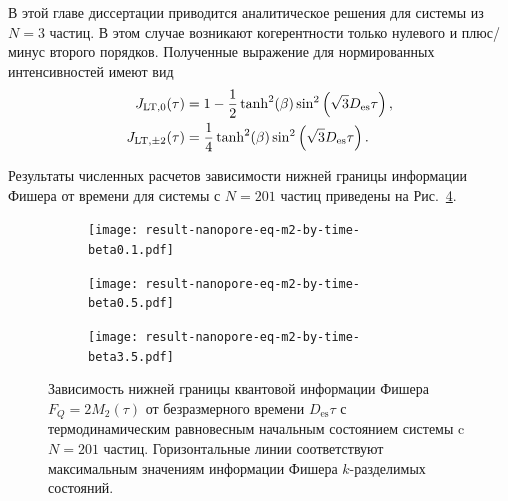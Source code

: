 В этой главе диссертации приводится аналитическое решения для системы из $N=3$ частиц.
В этом случае возникают когерентности только нулевого и плюс/минус второго порядков.
Полученные выражение для нормированных интенсивностей имеют вид
%
\begin{align}\label{eq:j_lt_3}
  J_{\mathrm{LT}, 0}(\tau) & = 1 - \frac 1 2 \tanh^2(\beta)\sin^2\left( \sqrt 3 D_\mathrm{es} \tau \right), \\
  J_{\mathrm{LT},\pm 2}(\tau) & = \frac 1 4 \tanh^2(\beta)\sin^2\left( \sqrt 3 D_\mathrm{es} \tau \right).
\end{align}


Результаты численных расчетов зависимости нижней границы информации Фишера от времени для системы с $N=201$ частиц приведены на Рис.~\ref{fig:result-nanopore-eq-m2-by-time-betas}.

\begin{figure}[H]
  \centering
  \begin{subfigure}[t]{0.3\textwidth}
    \centering
    \texttt{[image: result-nanopore-eq-m2-by-time-beta0.1.pdf]}
    \caption{\protect}
    \label{fig:result-nanopore-eq-m2-by-time-beta0.1}
  \end{subfigure}
  \begin{subfigure}[t]{0.31\textwidth}
    \centering
    \texttt{[image: result-nanopore-eq-m2-by-time-beta0.5.pdf]}
    \caption{\protect}
    \label{fig:result-nanopore-eq-m2-by-time-beta0.5}
  \end{subfigure}
  \begin{subfigure}[t]{0.33\textwidth}
    \centering
    \texttt{[image: result-nanopore-eq-m2-by-time-beta3.5.pdf]}
    \caption{\protect}
    \label{fig:result-nanopore-eq-m2-by-time-beta3.5}
  \end{subfigure}
  \caption{
    Зависимость нижней границы квантовой информации Фишера $F_Q = 2M_2(\tau)$ от безразмерного времени $D_\mathrm{es}\tau$ с термодинамическим равновесным начальным состоянием системы c $N=201$ частиц.
    Горизонтальные линии соответствуют максимальным значениям информации Фишера $k$-разделимых состояний.
  }
  \label{fig:result-nanopore-eq-m2-by-time-betas}
\end{figure}


